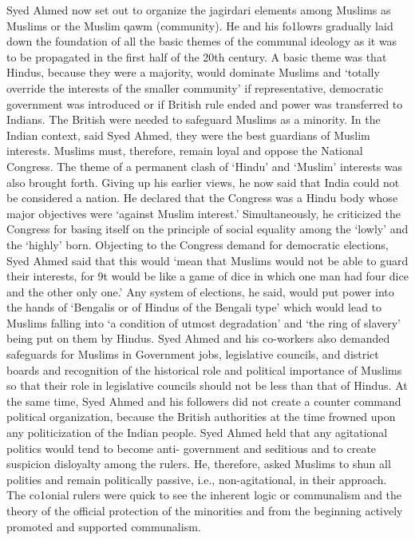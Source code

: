 Syed Ahmed now set out to organize the jagirdari elements among Muslims as Muslims or the Muslim qawm (community). He and his fo1lowrs gradually laid down the foundation of all the basic themes of the communal ideology as it was to be propagated in the first half of the 20th century. A basic theme was that Hindus, because they were a majority, would dominate Muslims and `totally override the interests of the smaller community' if representative, democratic government was introduced or if British rule ended and power was transferred to Indians. The British were needed to safeguard Muslims as a minority. In the Indian context, said Syed Ahmed, they were the best guardians of Muslim interests. Muslims must, therefore, remain loyal and oppose the National Congress. The theme of a permanent clash of `Hindu' and `Muslim' interests was also brought forth. Giving up his earlier views, he now said that India could not be considered a nation. He declared that the Congress was a Hindu body whose major objectives were `against Muslim interest.' Simultaneously, he criticized the Congress for basing itself on the principle of social equality among the `lowly' and the `highly' born. Objecting to the Congress demand for democratic elections, Syed Ahmed said that this would `mean that Muslims would not be able to guard their interests, for 9t would be like a game of dice in which one man had four dice and the other only one.' Any system of elections, he said, would put power into the hands of `Bengalis or of Hindus of the Bengali type' which would lead to Muslims falling into `a condition of utmost degradation' and `the ring of slavery' being put on them by Hindus. Syed Ahmed and his co-workers also demanded safeguards for Muslims in Government jobs, legislative councils, and district boards and recognition of the historical role and political importance of Muslims so that their role in legislative councils should not be less than that of Hindus. At the same time, Syed Ahmed and his followers did not create a counter command political organization, because the British authorities at the time frowned upon any politicization of the Indian people. Syed Ahmed held that any agitational politics would tend to become anti- government and seditious and to create suspicion disloyalty among the rulers. He, therefore, asked Muslims to shun all polities and remain politically passive, i.e., non-agitational, in their approach. The co1onial rulers were quick to see the inherent logic or communalism and the theory of the official protection of the minorities and from the beginning actively promoted and supported communalism. 

